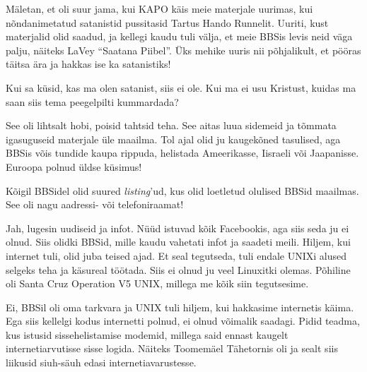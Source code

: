 Mäletan, et oli suur jama, kui KAPO käis meie materjale uurimas, 
kui nõndanimetatud satanistid pussitasid Tartus Hando 
Runnelit. Uuriti, kust materjalid olid saadud, ja kellegi 
kaudu tuli välja, et meie BBSis levis neid väga palju, näiteks LaVey \enquote{Saatana 
Piibel}. Üks mehike uuris nii põhjalikult, 
et pööras täitsa ära ja hakkas ise ka satanistiks!

Kui sa küsid, kas ma olen satanist, siis ei ole. Kui ma ei 
usu Kristust, kuidas ma saan siis tema peegelpilti kummardada?


See oli lihtsalt hobi, poisid tahtsid teha. See aitas luua sidemeid ja tõmmata igasuguseid materjale üle 
maailma. Tol ajal olid ju kaugekõned tasulised, aga BBSis võis tundide kaupa rippuda, helistada 
Ameerikasse, Iisraeli või Jaapanisse. Euroopa polnud üldse küsimus!


Kõigil BBSidel olid suured \emph{listing}'ud, kus olid loetletud 
olulised BBSid maailmas. See oli nagu aadressi- või telefoniraamat! 


Jah, lugesin uudiseid ja infot. Nüüd istuvad kõik Facebookis, aga siis seda ju 
ei olnud. Siis olidki BBSid, mille kaudu vahetati infot ja saadeti meili. Hiljem, kui internet tuli, olid juba teised ajad. Et seal 
tegutseda, tuli endale UNIXi alused selgeks teha ja käsureal töötada. Siis ei 
olnud ju veel Linuxitki olemas. Põhiline oli Santa Cruz 
Operation V5 UNIX, millega 
me kõik siin tegutsesime.


Ei, BBSil oli oma tarkvara ja UNIX tuli hiljem, kui hakkasime internetis 
käima. Ega siis kellelgi kodus 
internetti polnud, ei olnud võimalik saadagi. Pidid teadma, kus istusid sissehelistamise modemid, millega said ennast kaugelt internetiarvutisse 
sisse logida. Näiteks Toomemäel Tähetornis oli ja sealt siis 
liikusid siuh-säuh edasi internetiavarustesse.



